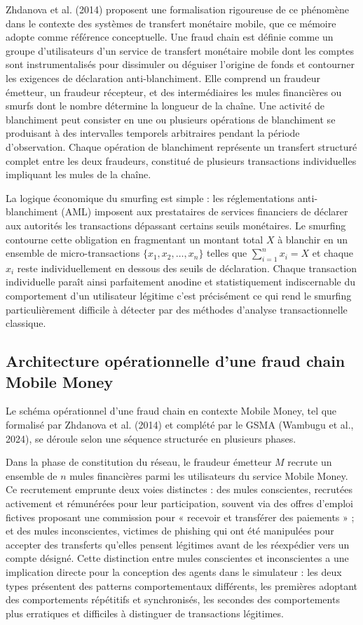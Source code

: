 \documentclass[11pt,a4paper,oneside]{report}
\theoremstyle{definition}
\theoremstyle{remark}
\begin{document}
Zhdanova et al. (2014) proposent une formalisation rigoureuse de ce phénomène dans le contexte des systèmes de transfert monétaire mobile, que ce mémoire adopte comme référence conceptuelle. Une fraud chain est définie comme un groupe d'utilisateurs d'un service de transfert monétaire mobile dont les comptes sont instrumentalisés pour dissimuler ou déguiser l'origine de fonds et contourner les exigences de déclaration anti-blanchiment. Elle comprend un fraudeur émetteur, un fraudeur récepteur, et des intermédiaires  les mules financières ou smurfs  dont le nombre détermine la longueur de la chaîne. Une activité de blanchiment peut consister en une ou plusieurs opérations de blanchiment se produisant à des intervalles temporels arbitraires pendant la période d'observation. Chaque opération de blanchiment représente un transfert structuré complet entre les deux fraudeurs, constitué de plusieurs transactions individuelles impliquant les mules de la chaîne.

La logique économique du smurfing est simple : les réglementations anti-blanchiment (AML) imposent aux prestataires de services financiers de déclarer aux autorités les transactions dépassant certains seuils monétaires. Le smurfing contourne cette obligation en fragmentant un montant total $X$ à blanchir en un ensemble de micro-transactions $\{x_1, x_2, \ldots, x_n\}$ telles que $\sum_{i=1}^n x_i = X$ et chaque $x_i$ reste individuellement en dessous des seuils de déclaration. Chaque transaction individuelle paraît ainsi parfaitement anodine et statistiquement indiscernable du comportement d'un utilisateur légitime  c'est précisément ce qui rend le smurfing particulièrement difficile à détecter par des méthodes d'analyse transactionnelle classique.

\subsection{Architecture opérationnelle d'une fraud chain Mobile Money}

Le schéma opérationnel d'une fraud chain en contexte Mobile Money, tel que formalisé par Zhdanova et al. (2014) et complété par le GSMA (Wambugu et al., 2024), se déroule selon une séquence structurée en plusieurs phases.

Dans la phase de constitution du réseau, le fraudeur émetteur $M$ recrute un ensemble de $n$ mules financières parmi les utilisateurs du service Mobile Money. Ce recrutement emprunte deux voies distinctes : des mules conscientes, recrutées activement et rémunérées pour leur participation, souvent via des offres d'emploi fictives proposant une commission pour « recevoir et transférer des paiements » ; et des mules inconscientes, victimes de phishing qui ont été manipulées pour accepter des transferts qu'elles pensent légitimes avant de les réexpédier vers un compte désigné. Cette distinction entre mules conscientes et inconscientes a une implication directe pour la conception des agents dans le simulateur : les deux types présentent des patterns comportementaux différents, les premières adoptant des comportements répétitifs et synchronisés, les secondes des comportements plus erratiques et difficiles à distinguer de transactions légitimes.
\end{document}
